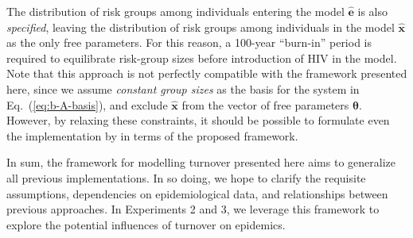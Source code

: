 The distribution of risk groups among individuals entering the model $\bm{\hat{e}}$
is also \emph{specified},
leaving the distribution of risk groups among individuals in the model $\bm{\hat{x}}$
as the only free parameters.
For this reason, a 100-year ``burn-in'' period is required
to equilibrate risk-group sizes before introduction of HIV in the model.
Note that this approach is not perfectly compatible with the framework presented here,
since we assume \emph{constant group sizes}
as the basis for the system in Eq.~(\ref{eq:b-A-basis}),
and exclude $\bm{\hat{x}}$ from the vector of free parameters $\bm{\theta}$.
However, by relaxing these constraints,
it should be possible to formulate even the implementation by \citet{Boily2015}
in terms of the proposed framework.
\par
In sum, the framework for modelling turnover presented here aims to generalize
all previous implementations.
In so doing, we hope to clarify the requisite assumptions,
dependencies on epidemiological data,
and relationships between previous approaches.
In Experiments 2 and 3, we leverage this framework to explore
the potential influences of turnover on epidemics.